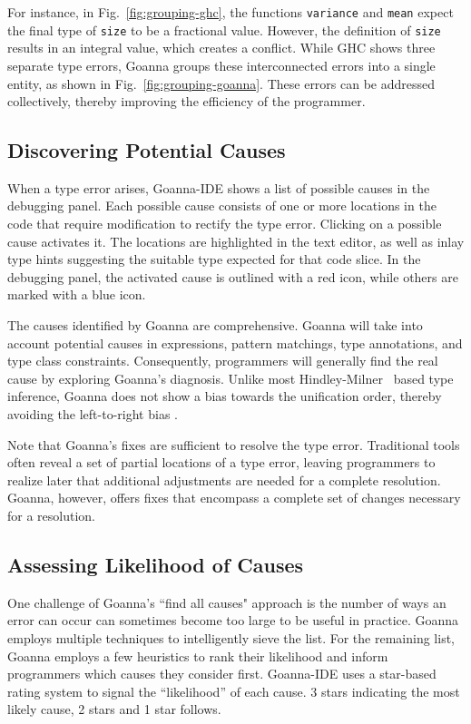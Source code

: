\documentclass[pdflatex,sn-mathphys-num]{sn-jnl}%
\begin{document}
    For instance, in Fig.~\ref{fig:grouping-ghc}, the functions \texttt{variance} and \texttt{mean} expect the final type of \texttt{size} to be a fractional value. However, the definition of \texttt{size} results in an integral value, which creates a conflict. While GHC shows three separate type errors, Goanna groups these interconnected errors into a single entity, as shown in Fig.~\ref{fig:grouping-goanna}. These errors can be addressed collectively, thereby improving the efficiency of the programmer.

    \subsection{Discovering Potential Causes} \label{sub:suggesting}
    When a type error arises, Goanna-IDE shows a list of possible causes in the debugging panel. Each possible cause consists of one or more locations in the code that require modification to rectify the type error. Clicking on a possible cause activates it. The locations are highlighted in the text editor, as well as inlay type hints suggesting the suitable type expected for that code slice. In the debugging panel, the activated cause is outlined with a red icon, while others are marked with a blue icon. 

    The causes identified by Goanna are comprehensive. Goanna will take into account potential causes in expressions, pattern matchings, type annotations, and type class constraints. Consequently, programmers will generally find the real cause by exploring Goanna's diagnosis. Unlike most Hindley-Milner~\cite{Damas1982-zw} based type inference, Goanna does not show a bias towards the unification order, thereby avoiding the left-to-right bias \cite{Chen2014-ev}. 
    
    Note that Goanna's fixes are sufficient to resolve the type error. Traditional tools often reveal a set of partial locations of a type error, leaving programmers to realize later that additional adjustments are needed for a complete resolution. Goanna, however, offers fixes that encompass a complete set of changes necessary for a resolution.


    \subsection{Assessing Likelihood of Causes} \label{sub:conciseness}
    One challenge of Goanna's ``find all causes" approach is the number of ways an error can occur can sometimes become too large to be useful in practice. Goanna employs multiple techniques to intelligently sieve the list. For the remaining list, Goanna employs a few heuristics to rank their likelihood and inform programmers which causes they consider first. 
    Goanna-IDE uses a star-based rating system to signal the ``likelihood'' of each cause. 3 stars indicating the most likely cause, 2 stars and 1 star follows. 
\end{document}
